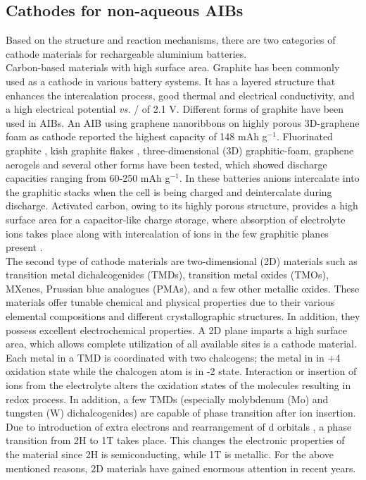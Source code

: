 \subsection{Cathodes for non-aqueous AIBs}
Based on the structure and reaction mechanisms, there are two categories of cathode materials for rechargeable aluminium batteries.\\
Carbon-based materials with high surface area. Graphite has been commonly used as a cathode in various battery systems. It has a layered structure that enhances the intercalation process, good thermal and electrical conductivity, and a high electrical potential \textit{vs.} / of 2.1 V. Different forms of graphite have been used in AIBs. An AIB using graphene nanoribbons on highly porous 3D-graphene foam as cathode reported the highest capacity of 148 mAh g$^{-1}$. Fluorinated graphite \cite{rani_fluorinated_2013}, kish graphite flakes \cite{wang_kish_2017-1}, three-dimensional (3D) graphitic-foam\cite{wu_3d_2016}, graphene aerogels\cite{huang_graphene_2019} and several other forms have been tested, which showed discharge capacities ranging from 60-250 mAh g$^{-1}$. In these batteries  anions intercalate into the graphitic stacks when the cell is being charged and deintercalate during discharge. Activated carbon, owing to its highly porous structure, provides a high surface area for a capacitor-like charge storage, where absorption of electrolyte ions takes place along with intercalation of ions in the few graphitic planes present \cite{eliad_ion_2001, zhu_carbon-based_2011-2}.\\
The second type of cathode materials are two-dimensional (2D) materials such as transition metal dichalcogenides (TMDs), transition metal oxides (TMOs), MXenes, Prussian blue analogues (PMAs), and a few other metallic oxides. These materials offer tunable chemical and physical properties due to their various elemental compositions and different crystallographic structures. In addition, they possess excellent electrochemical properties\cite{chia_elec}. A 2D plane imparts a high surface area, which allows complete utilization of all available sites is a cathode material\cite{jia_interfacial,naguib_mxene}. Each metal in a TMD is coordinated with two chalcogens; the metal in in +4 oxidation state while the chalcogen atom is in -2 state. Interaction or insertion of ions from the electrolyte alters the oxidation states of the molecules resulting in redox process. In addition, a few TMDs (especially molybdenum (Mo) and tungsten (W) dichalcogenides) are capable of phase transition after ion insertion. Due to introduction of extra electrons and rearrangement of d orbitals \cite{}, a phase transition from 2H to 1T takes place. This changes the electronic properties of the material since 2H  is semiconducting, while 1T  is metallic. For the above mentioned reasons, 2D materials have gained enormous attention in recent years. 
